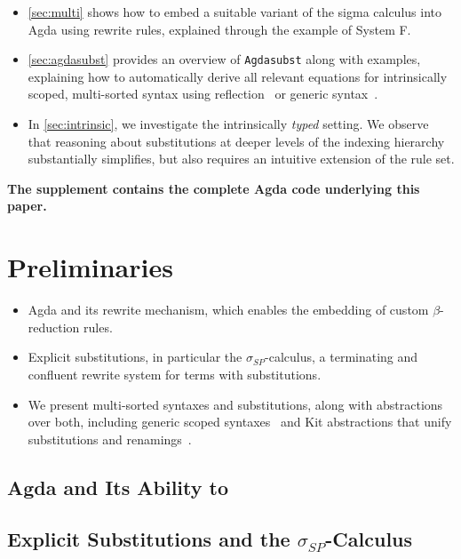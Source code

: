 \documentclass[screen,nonacm]{acmart}
\begin{document}
\begin{itemize}
  \item \cref{sec:multi} shows how to embed a suitable variant of the
        sigma calculus into Agda using rewrite rules, explained through the example of System F.

  \item \cref{sec:agdasubst} provides an overview of \texttt{Agdasubst} along with examples, 
        explaining how to automatically derive all relevant equations for intrinsically scoped, 
        multi-sorted syntax using reflection~\cite{saffrich:LIPIcs.ITP.2024.32} 
        or generic syntax~\cite{allais2021typescopesafeuniverse}.

  \item In \cref{sec:intrinsic}, we investigate the intrinsically \emph{typed} setting.
        We observe that reasoning about substitutions at deeper levels of the indexing
        hierarchy substantially simplifies, but also requires an intuitive extension of
        the rule set.
\end{itemize}

\textbf{The supplement contains the complete Agda code underlying this paper.}

\section{Preliminaries}\label{sec:preliminaries}

\begin{itemize}
  \item Agda and its rewrite mechanism, which enables the embedding of custom
        $\beta$-reduction rules.
  \item Explicit substitutions, in particular the $\sigma_{SP}$-calculus, a terminating
        and confluent rewrite system for terms with substitutions.
  \item We present multi-sorted syntaxes and substitutions, along with abstractions over both, 
        including generic scoped syntaxes~\cite{allais2021typescopesafeuniverse} and 
        Kit abstractions that unify substitutions and renamings~\cite{stronglytyped,ren-sub}.
\end{itemize}

\subsection{Agda and Its Ability to }

\subsection{Explicit Substitutions and the $\sigma_{SP}$-Calculus}
\end{document}
